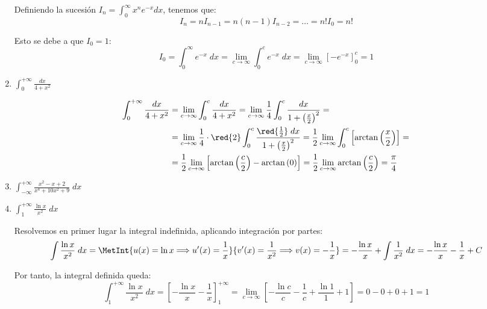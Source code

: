 \begin{ejercicio}
\begin{enumerate}
        Definiendo la sucesión $\displaystyle I_n=\int_0^{\infty} x^n e^{-x}dx$, tenemos que:
        \begin{equation*}
            I_n = nI_{n-1} = n(n-1)I_{n-2} = \dots = n!I_0 = n!
        \end{equation*}
            
        Esto se debe a que $I_0 = 1$:
        \begin{equation*}
            I_0 = \int_0^\infty e^{-x}\;dx
            =\lim_{c\to \infty} \int_0^c e^{-x}\;dx
            =\lim_{c\to \infty} \left[-e^{-x}\right]_0^c = 1
        \end{equation*}

    
    \item $\displaystyle \int_{0}^{+\infty} \frac{dx}{4+x^2}$
    
    \begin{align*}
        \int_{0}^{+\infty} \frac{dx}{4+x^2} &= \lim_{c\to \infty} \int_{0}^{c} \frac{dx}{4+x^2}
        = \lim_{c\to \infty} \frac{1}{4} \int_{0}^{c} \frac{dx}{1+\left(\frac{x}{2}\right)^2} =\\
        &= \lim_{c\to \infty} \frac{1}{4}\cdot \red{2} \int_{0}^{c} \frac{\red{\frac{1}{2}}\;dx}{1+\left(\frac{x}{2}\right)^2}
        = \frac{1}{2}\lim_{c\to \infty} \int_{0}^{c} \left[\arctan \left(\frac{x}{2}\right)\right] =\\
        &= \frac{1}{2}\lim_{c\to \infty} \left[\arctan \left(\frac{c}{2}\right)-\arctan \left(0\right)\right] =
        \frac{1}{2}\lim_{c\to \infty} \arctan \left(\frac{c}{2}\right) = \frac{\pi}{4}
    \end{align*}

    \item $\displaystyle \int_{-\infty}^{+\infty} \frac{x^2-x+2}{x^4+10x^2+9}\;dx$
    
    \item $\displaystyle \int_{1}^{+\infty} \frac{\ln x}{x^2}\;dx$
    
    Resolvemos en primer lugar la integral indefinida, aplicando integración por partes:
    \begin{equation*}
        \int \frac{\ln x}{x^2}\;dx
        = \MetInt{u(x)=\ln x \Longrightarrow u'(x)=\frac{1}{x}}{v'(x)=\frac{1}{x^2} \Longrightarrow v(x)=-\frac{1}{x}}
        = -\frac{\ln x}{x} + \int \frac{1}{x^2}\;dx
        = -\frac{\ln x}{x} - \frac{1}{x}+C
    \end{equation*}

    Por tanto, la integral definida queda:
    \begin{equation*}
        \int_{1}^{+\infty} \frac{\ln x}{x^2}\;dx
        = \left[-\frac{\ln x}{x} - \frac{1}{x}\right]_1^{+\infty}
        = \lim_{c\to \infty}\left[-\frac{\ln c}{c} - \frac{1}{c} + \frac{\ln 1}{1} + 1\right]
        = 0 - 0 + 0 + 1 = 1
    \end{equation*}


\end{enumerate}
\end{ejercicio}

